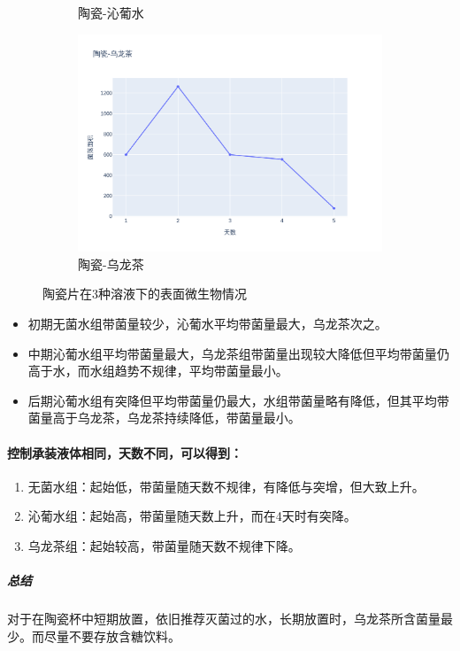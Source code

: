 \documentclass[12pt,a4paper]{ctexart}
\begin{document}
\begin{figure}[htbp]
\begin{subfigure}[b]{0.31\textwidth}
        \caption{陶瓷-沁葡水}
        \label{subfig:2}
    \end{subfigure}
    \hfill  %
    \begin{subfigure}[b]{0.31\textwidth}
        \centering
        \includegraphics[width=\linewidth]{./plot/SingleMaterial/china/陶瓷-乌龙茶_line.png}
        \caption{陶瓷-乌龙茶}
        \label{subfig:3}
    \end{subfigure}
    \caption{陶瓷片在3种溶液下的表面微生物情况}
    \label{fig:triple_horizontal}  %
\end{figure}
\begin{itemize}
    \item 初期无菌水组带菌量较少，沁葡水平均带菌量最大，乌龙茶次之。
    \item 中期沁葡水组平均带菌量最大，乌龙茶组带菌量出现较大降低但平均带菌量仍高于水，而水组趋势不规律，平均带菌量最小。
    \item 后期沁葡水组有突降但平均带菌量仍最大，水组带菌量略有降低，但其平均带菌量高于乌龙茶，乌龙茶持续降低，带菌量最小。
\end{itemize}


\paragraph{控制承装液体相同，天数不同，可以得到：}
\begin{enumerate}
    \item 无菌水组：起始低，带菌量随天数不规律，有降低与突增，但大致上升。
    \item 沁葡水组：起始高，带菌量随天数上升，而在4天时有突降。
    \item 乌龙茶组：起始较高，带菌量随天数不规律下降。
\end{enumerate}
\subparagraph{总结}
对于在陶瓷杯中短期放置，依旧推荐灭菌过的水，长期放置时，乌龙茶所含菌量最少。而尽量不要存放含糖饮料。
\end{document}
